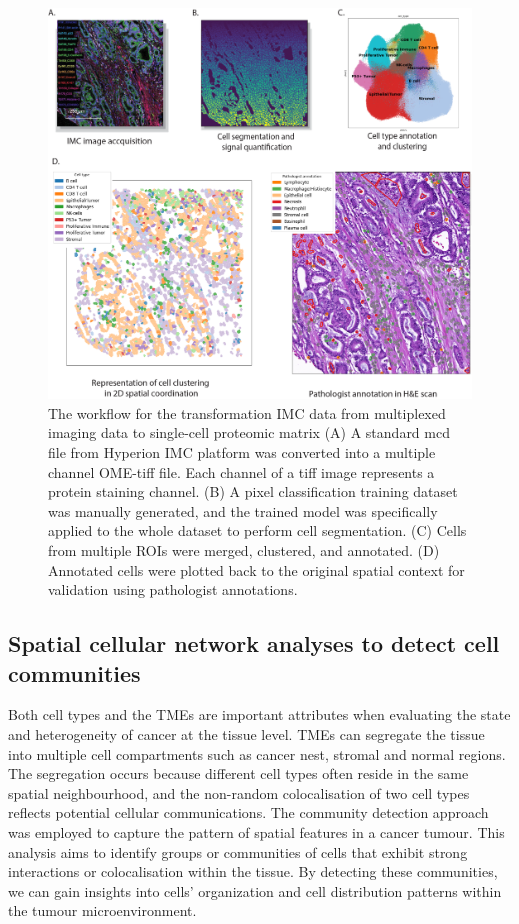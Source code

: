 \begin{figure}[htp]
    \centering
    \includegraphics[width=\columnwidth]{Chapter3/Figures/Chapter3_Figure2_IMC_cellID_ver2.png}
    \caption[Cell identification from Hyperion Imaging Mass Cytometry data]{The workflow for the transformation IMC data from multiplexed imaging data to single-cell proteomic matrix (A) A standard mcd file from Hyperion IMC platform was converted into a multiple channel OME-tiff file. Each channel of a tiff image represents a protein staining channel. (B) A pixel classification training dataset was manually generated, and the trained model was  specifically applied to the whole dataset to perform cell segmentation. (C) Cells from multiple ROIs were merged, clustered, and annotated. (D) Annotated cells were plotted back to the original spatial context for validation using pathologist annotations.}
    \label{Chap3:fig:IMC_cell_type_annotation}
\end{figure}
\subsection{Spatial cellular network analyses to detect cell communities}
\label{Chap:3:Community_detection_Method}
Both cell types and the TMEs are important attributes when evaluating the state and heterogeneity of cancer at the tissue level. TMEs can segregate the tissue into multiple cell compartments such as cancer nest, stromal and normal regions. The segregation occurs because different cell types often reside in the same spatial neighbourhood, and the non-random colocalisation of two cell types reflects potential cellular communications. The community detection approach was employed to capture the pattern of spatial features in a cancer tumour. This analysis aims to identify groups or communities of cells that exhibit strong interactions or colocalisation within the tissue. By detecting these communities, we can gain insights into cells' organization and cell distribution patterns within the tumour microenvironment. 

